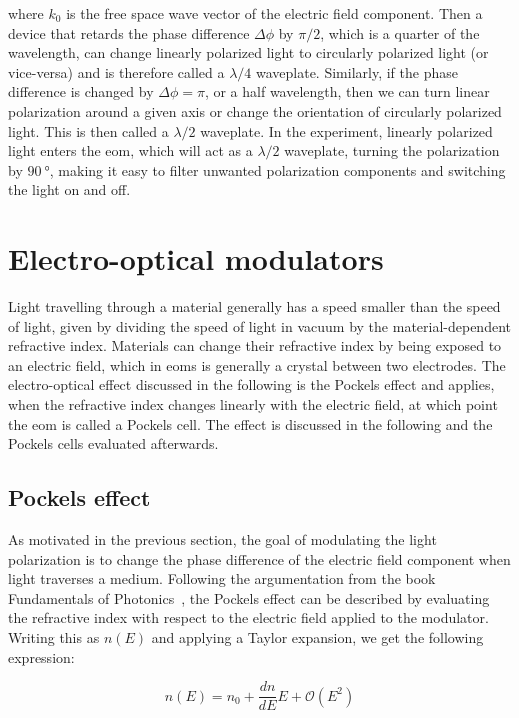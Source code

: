 where $k_0$ is the free space wave vector of the electric field component. Then a device that retards the phase difference $\Delta \phi$ by $\pi/2$, which is a quarter of the wavelength, can change linearly polarized light to circularly polarized light (or vice-versa) and is therefore called a $\lambda / 4$ waveplate. Similarly, if the phase difference is changed by $\Delta \phi = \pi$, or a half wavelength, then we can turn linear polarization around a given axis or change the orientation of circularly polarized light. This is then called a $\lambda / 2$ waveplate. In the experiment, linearly polarized light enters the \ac{eom}, which will act as a $\lambda / 2$ waveplate, turning the polarization by $\SI{90}{\degree}$, making it easy to filter unwanted polarization components and switching the light on and off.

\section{Electro-optical modulators}%
\label{sec:eom}

Light travelling through a material generally has a speed smaller than the speed of light, given by dividing the speed of light in vacuum by the material-dependent refractive index. Materials can change their refractive index by being exposed to an electric field, which in \acp{eom} is generally a crystal between two electrodes. The electro-optical effect discussed in the following is the Pockels effect and applies, when the refractive index changes linearly with the electric field, at which point the \ac{eom} is called a Pockels cell. The effect is discussed in the following and the Pockels cells evaluated afterwards.

\subsection{Pockels effect}%
\label{sec:Pockels_effect}

As motivated in the previous section, the goal of modulating the light polarization is to change the phase difference of the electric field component when light traverses a medium. Following the argumentation from the book Fundamentals of Photonics~\cite{Saleh1991}, the Pockels effect can be described by evaluating the refractive index with respect to the electric field applied to the modulator. Writing this as $n(E)$ and applying a Taylor expansion, we get the following expression:

\begin{equation}
	n(E) = n_0 + \frac{dn}{dE} E + \mathcal{O}(E^2)
\end{equation}

